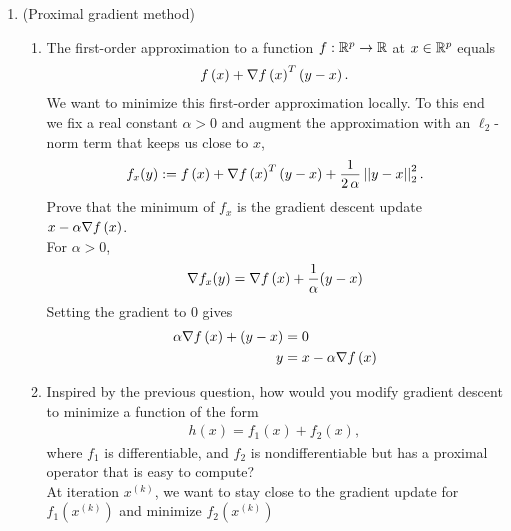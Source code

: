 \documentclass[12pt,twoside]{article}
\begin{document}
\begin{enumerate}
 \newpage
  \item (Proximal gradient method)   
 \begin{enumerate}
 \item The first-order approximation to a function $f:\mathbb{R}^{p}\rightarrow \mathbb{R}$ at $x \in \mathbb{R}^{p}$ equals
 \begin{align}
f\left( x \right) + \nabla f\left( x \right)^T\left( y-x \right). 
\end{align}
We want to minimize this first-order approximation locally. To this end we fix a real constant $\alpha >0$ and augment the approximation with an $\ell_2$-norm term that keeps us close to $x$,
 \begin{align}
f_{x}(y) :=f\left( x \right) + \nabla f\left( x \right)^T\left( y-x \right) +  \frac{1}{2 \, \alpha }\left|\left| y-x \right|\right| _{2}^2.
\end{align}
 Prove that the minimum of $f_{x}$ is the gradient descent update $x- \alpha \nabla f\left( x \right)$.\\
 For $\alpha > 0$,
 \begin{align*}
 	\nabla f_{x}(y) &= \nabla f\left( x \right) +   \frac{1}{\alpha } (y - x) \\
 \end{align*} 
 Setting the gradient to $0$ gives
 \begin{align*}
 	\alpha \nabla f\left( x \right) + (y - x)  &= 0\\
	y &= x - \alpha \nabla f\left( x \right) \\
 \end{align*} 
 
\item 
Inspired by the previous question, how would you modify gradient descent to minimize a function of the form
\begin{align}
h(x) = f_1(x) + f_2(x),
\end{align}
where $f_1$ is differentiable, and $f_2$ is nondifferentiable but has a proximal operator that is easy to compute?\\
At iteration $x^{(k)}$, we want to stay close to the gradient update for $f_1(x^{(k)})$ and minimize $f_2(x^{(k)})$


\end{enumerate}
\end{enumerate}
\end{document}
